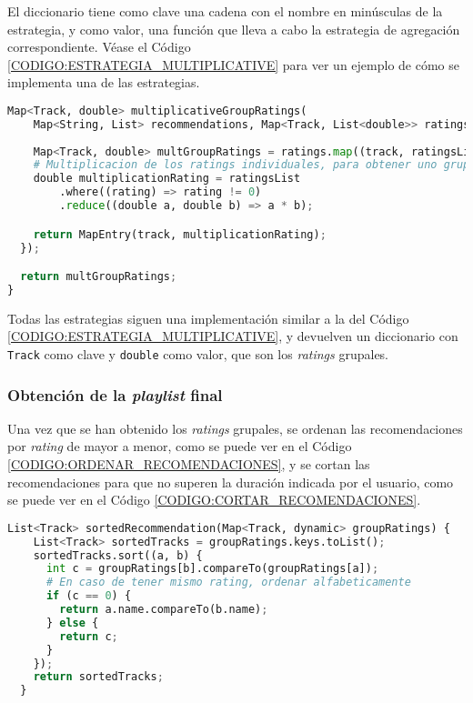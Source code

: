 El diccionario tiene como clave una cadena con el nombre en minúsculas de la estrategia, y como valor, 
una función que lleva a cabo la estrategia de agregación correspondiente. Véase el Código \ref{CODIGO:ESTRATEGIA_MULTIPLICATIVE} 
para ver un ejemplo de cómo se implementa una de las estrategias.

\begin{lstlisting}[language=python, caption=Estrategia de agregación \textit{average}, label=CODIGO:ESTRATEGIA_MULTIPLICATIVE]
Map<Track, double> multiplicativeGroupRatings(
    Map<String, List> recommendations, Map<Track, List<double>> ratings) {
  
    Map<Track, double> multGroupRatings = ratings.map((track, ratingsList) {
    # Multiplicacion de los ratings individuales, para obtener uno grupal
    double multiplicationRating = ratingsList
        .where((rating) => rating != 0)
        .reduce((double a, double b) => a * b);

    return MapEntry(track, multiplicationRating);
  });

  return multGroupRatings;
}
\end{lstlisting}

Todas las estrategias siguen una implementación similar a la del Código \ref{CODIGO:ESTRATEGIA_MULTIPLICATIVE},
y devuelven un diccionario con \texttt{Track} como clave y \texttt{double} como valor, que son los \textit{ratings} grupales.

\subsubsection{Obtención de la \textit{playlist} final\label{subsec:playlist_final_implementacion}}

Una vez que se han obtenido los \textit{ratings} grupales, se ordenan las recomendaciones por \textit{rating} de mayor a menor, como 
se puede ver en el Código \ref{CODIGO:ORDENAR_RECOMENDACIONES}, y se cortan las recomendaciones para que no superen la duración 
indicada por el usuario, como se puede ver en el Código \ref{CODIGO:CORTAR_RECOMENDACIONES}.

\begin{lstlisting}[language=python, caption=Ordenar recomendaciones, label=CODIGO:ORDENAR_RECOMENDACIONES]
  List<Track> sortedRecommendation(Map<Track, dynamic> groupRatings) {
    List<Track> sortedTracks = groupRatings.keys.toList();
    sortedTracks.sort((a, b) {
      int c = groupRatings[b].compareTo(groupRatings[a]);
      # En caso de tener mismo rating, ordenar alfabeticamente
      if (c == 0) {
        return a.name.compareTo(b.name);
      } else {
        return c;
      }
    });
    return sortedTracks;
  }
\end{lstlisting}

